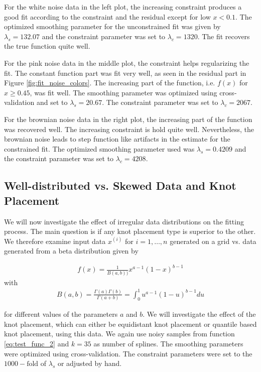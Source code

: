 \documentclass[10pt,a4paper]{article}
\begin{document}
For the white noise data in the left plot, the increasing constraint produces a good fit according to the constraint and the residual except for low $x < 0.1$. The optimized smoothing parameter for the unconstrained fit was given by $\lambda_s = 132.07$ and the constraint parameter was set to $\lambda_c = 1320$. The fit recovers the true function quite well. 

For the pink noise data in the middle plot, the constraint helps regularizing the fit. The constant function part was fit very well, as seen in the residual part in Figure \ref{fig:fit_noise_colors}. The increasing part of the function, i.e. $f(x)$ for $x \ge 0.45$,  was fit well. The smoothing parameter was optimized using cross-validation and set to $\lambda_s = 20.67$. The constraint parameter was set to $\lambda_c = 2067$. 

For the brownian noise data in the right plot, the increasing part of the function was recovered well. The increasing constraint is hold quite well. Nevertheless, the brownian noise leads to step function like artifacts in the estimate for the constrained fit. The optimized smoothing parameter used was $\lambda_s = 0.4209$ and the constraint parameter was set to $\lambda_c = 4208$.

\subsection{Well-distributed vs. Skewed Data and Knot Placement} \label{subsec:skewed-data}
We will now investigate the effect of irregular data distributions on the fitting process. The main question is if any knot placement type is superior to the other. We therefore examine input data $x^{(i)}$ for $i = 1, \dots, n$ generated on a grid vs. data generated from a beta distribution given by

\begin{align}
	f(x) = \frac{1}{B(a, b))} x^{a-1} (1-x)^{b-1} 
\end{align}
with
\begin{align}
	B(a,b) = \frac{\Gamma(a)\Gamma(b)}{\Gamma(a+b)} = \int_0^1 u^{a-1} (1-u)^{b-1} du
\end{align}


for different values of the parameters $a$ and $b$. We will investigate the effect of the knot placement, which can either be equidistant knot placement or quantile based knot placement, using this data. We again use noisy samples from function \ref{eq:test_func_2} and $k=35$ as number of splines. The smoothing parameters were optimized using cross-validation. The constraint parameters were set to the $1000-\text{fold}$ of $\lambda_s$ or adjusted by hand.
\end{document}
